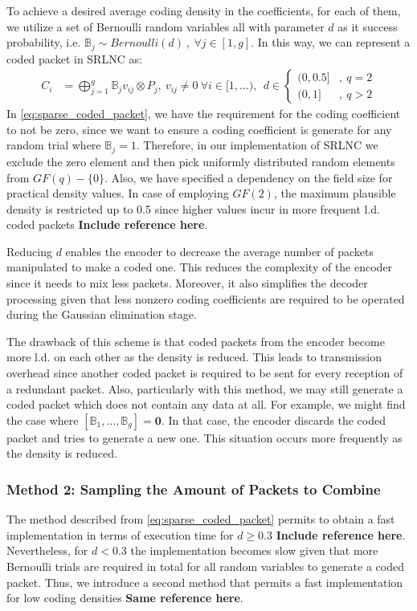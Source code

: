 To achieve a desired average coding density in the coefficients, for each
of them, we utilize a set of Bernoulli random variables all with parameter
$d$ as it success probability, i.e. $\mathbb{B}_j \sim Bernoulli(d)\ ,\ \forall
j \in [1,g]$. In this way, we can represent a coded packet in \ac{SRLNC} as:
%
\begin{align} \label{eq:sparse_coded_packet}
    C_i  &= \bigoplus_{j=1}^{g} \mathbb{B}_j v_{ij} \otimes P_j ,\ v_{ij}
    \neq 0\
    \forall i \in [1,\ldots) ,\ \
    d \in
    \begin{cases}
        {(0,0.5]} & ,\ q = 2 \\
        {(0,1]}   & ,\ q > 2
    \end{cases}
\end{align}
%
In \eqref{eq:sparse_coded_packet}, we have the requirement for the coding
coefficient to not be zero, since we want to ensure a coding coefficient
is generate for any random trial where $\mathbb{B}_j = 1$. Therefore, in our
implementation of \ac{SRLNC} we exclude the zero element and then pick
uniformly distributed random elements from $GF(q)-\{ 0 \}$. Also, we have
specified a dependency on the field size for practical
density values. In case of employing $GF(2)$, the
maximum plausible density is restricted up to 0.5 since higher values incur
in more frequent \ac{l.d.} coded packets \textbf{Include reference here}.

Reducing $d$ enables the encoder to decrease the average number of packets
manipulated to make a coded one. This reduces the complexity of the encoder
since it needs to mix less packets. Moreover, it also simplifies the decoder
processing given that less nonzero coding coefficients are required to be
operated during the Gaussian elimination stage.

The drawback of this scheme is that coded packets from the encoder
become more \ac{l.d.} on each other as the density is reduced.
This leads to transmission overhead since another coded packet
is required to be sent for every reception of a redundant packet.
Also, particularly with this method, we may still generate a coded packet
which does not contain any data at all. For example, we might find
the case where $\left[\mathbb{B}_1, \ldots, \mathbb{B}_g \right] =
\mathbf{0}$. In that case, the encoder discards the coded packet
and tries to generate a new one. This situation occurs more frequently
as the density is reduced.

\subsubsection{Method 2: Sampling the Amount of Packets to Combine}
The method described from \eqref{eq:sparse_coded_packet} permits
to obtain a fast implementation in terms of execution time for
$d \geq 0.3$ \textbf{Include reference here}. Nevertheless, for $d < 0.3$
the implementation becomes slow given that more Bernoulli trials are
required in total for all random variables to generate a coded packet.
Thus, we introduce a second method that permits a fast implementation
for low coding densities \textbf{Same reference here}.

